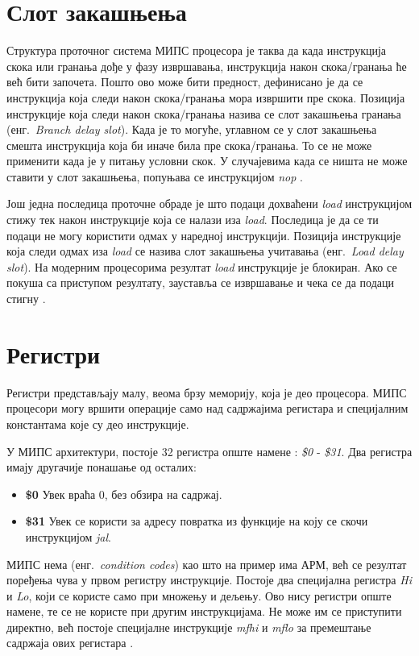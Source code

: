 \documentclass[12pt,oneside]{memoir}
\begin{document}
\section{Слот закашњења}

Структура проточног система МИПС процесора је таква да када инструкција скока или гранања дође у фазу извршавања, инструкција након скока/гранања ће већ бити започета. Пошто ово може бити предност, дефинисано је да се инструкција која следи након скока/гранања мора извршити пре скока. Позиција инструкције која следи након скока/гранања назива се слот закашњења гранања (енг.~\textit{Branch delay slot}). Када је то могуће, углавном се у слот закашњења смешта инструкција која  би иначе била пре скока/гранања. То се не може применити када је у питању условни скок. У случајевима када се ништа не може ставити у слот закашњења, попуњава се инструкцијом \textit{nop} \cite{mips}.

Још једна последица проточне обраде је што подаци дохваћени \textit{load} инструкцијом стижу тек након инструкције која се налази иза \textit{load}. Последица је да се ти подаци не могу користити одмах у наредној инструкцији. Позиција инструкције која следи одмах иза \textit{load} се назива слот закашњења учитавања (енг.~\textit{Load delay slot}). На модерним процесорима резултат \textit{load} инструкције је блокиран. Ако се покуша са приступом резултату, зауставља се извршавање и чека се да подаци стигну \cite{mips}. 

\section{Регистри}
\label{sec:registers}
Регистри представљају малу, веома брзу меморију, која је део процесора. МИПС процесори могу вршити операције само над садржајима регистара и специјалним константама које су део инструкције.

У МИПС архитектури, постоје 32 регистра опште намене \cite{mips}: \textit{\$0} - \textit{\$31}. Два регистра имају другачије понашање од осталих: 
\begin{itemize}
\item \textbf{\$0} Увек враћа 0, без обзира на садржај.
\item \textbf{\$31} Увек се користи за адресу повратка из функције на коју се скочи инструкцијом \textit{jal}.
\end{itemize}

МИПС нема (енг.~\textit{condition codes}) као што на пример има АРМ, већ се резултат поређења чува у првом регистру инструкције. Постоје два специјална регистра \textit{Hi} и \textit{Lo}, који се користе само при множењу и дељењу. Ово нису регистри опште намене, те се не користе при другим инструкцијама. Не може им се приступити директно, већ постоје специјалне инструкције \textit{mfhi} и \textit{mflo} за премештање садржаја ових регистара \cite{mips}.
\end{document}
